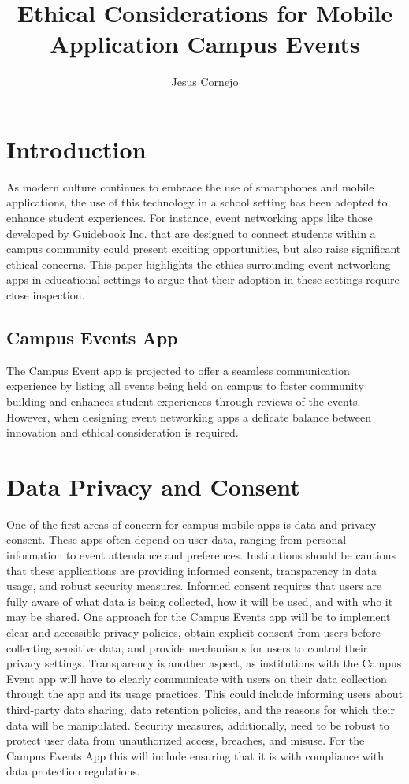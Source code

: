 \documentclass[10pt,twocolumn]{article}
\title{Ethical Considerations for Mobile Application Campus Events}
\author{Jesus Cornejo}
\affiliation{Occidental College}
\begin{document}
\maketitle

\section{Introduction}
As modern culture continues to embrace the use of smartphones and mobile applications, the use of this technology in a school setting has been adopted to enhance student experiences. For instance, event networking apps like those developed by Guidebook Inc. \cite{Guidebook} that are designed to connect students within a campus community could present exciting opportunities, but also raise significant ethical concerns. This paper highlights the ethics surrounding event networking apps in educational settings to argue that their adoption in these settings require close inspection. 
\subsection{Campus Events App}
The Campus Event app is projected to offer a seamless communication experience by listing all events being held on campus to foster community building and enhances student experiences through reviews of the events. However, when designing event networking apps a delicate balance between innovation and ethical consideration is required.\cite{Appedus}

\section{Data Privacy and Consent}
One of the first areas of concern for campus mobile apps is data and privacy consent. These apps often depend on user data, ranging from personal information to event attendance and preferences. Institutions should be cautious that these applications are providing informed consent, transparency in data usage, and robust security measures.\cite{Appedus}\cite{UofW_IT}\cite{ANA_MobileMarketing}
Informed consent requires that users are fully aware of what data is being collected, how it will be used, and with who it may be shared. One approach for the Campus Events app will be to implement clear and accessible privacy policies, obtain explicit consent from users before collecting sensitive data, and provide mechanisms for users to control their privacy settings.
Transparency is another aspect, as institutions with the Campus Event app will have to clearly communicate with users on their data collection through the app and its usage practices. This could include informing users about third-party data sharing, data retention policies, and the reasons for which their data will be manipulated.
Security measures, additionally, need to be robust to protect user data from unauthorized access, breaches, and misuse. For the Campus Events App this will include ensuring that it is with compliance with data protection regulations.
\end{document}
